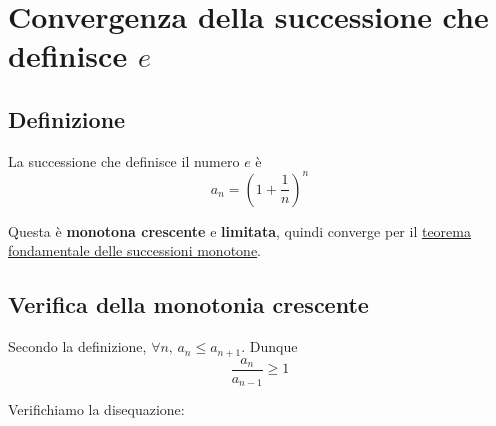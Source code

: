 \documentclass[../../analisi1]{subfiles}
\begin{document}
    \chapter{Convergenza della successione che definisce \(e\)}

        \section*{Definizione}

            La successione che definisce il numero \(e\) è
            \[
                a_n = {\left(1 + \frac{1}{n}\right)}^n
            \]

            Questa è \textbf{monotona crescente} e \textbf{limitata}, quindi converge per il
            \hyperref[teoFondSuccMono]{teorema fondamentale delle successioni monotone}.

        \section*{Verifica della monotonia crescente}

            Secondo la definizione, \(\forall n, \, a_n \leqslant a_{n + 1}\). Dunque
            \[
                \frac{a_n}{a_{n - 1}} \geqslant 1
            \]

            Verifichiamo la disequazione:
\end{document}

